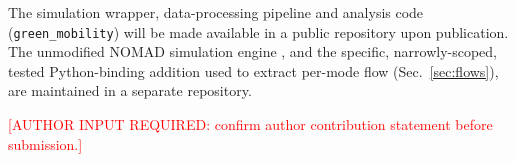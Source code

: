 \documentclass[pdflatex,sn-mathphys-ay]{sn-jnl}
\begin{document}
The simulation wrapper, data-processing pipeline and analysis code
(\texttt{green\_mobility}) will be made available in a public repository upon
publication. The unmodified NOMAD simulation engine
\cite{nomad2026}, and the specific, narrowly-scoped, tested Python-binding
addition used to extract per-mode flow (Sec.~\ref{sec:flows}), are maintained
in a separate repository.

\textcolor{red}{[AUTHOR INPUT REQUIRED: confirm author contribution
statement before submission.]}


\end{document}
